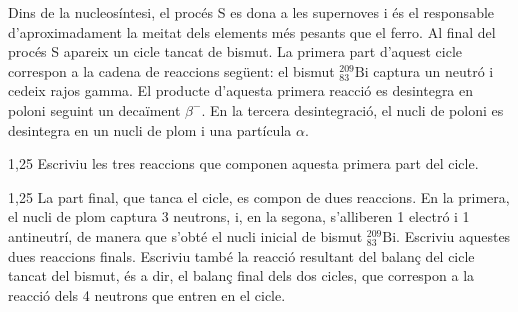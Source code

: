 Dins de la nucleosíntesi, el procés S es dona a les supernoves i és el responsable d'aproximadament la meitat dels elements més pesants que el ferro. Al final del procés S apareix un cicle tancat de bismut. La primera part d'aquest cicle correspon a la cadena de reaccions següent: el bismut ${}^{209}_{83}\mathrm{Bi}$ captura un neutró i cedeix rajos gamma. El producte d'aquesta primera reacció es desintegra en poloni seguint un decaïment $\beta^-$. En la tercera desintegració, el nucli de poloni es desintegra en un nucli de plom i una partícula $\alpha$.

\begin{apartat}{1,25}
Escriviu les tres reaccions que componen aquesta primera part del cicle.
\end{apartat}

\begin{apartat}{1,25}
La part final, que tanca el cicle, es compon de dues reaccions. En la primera, el nucli de plom captura 3 neutrons, i, en la segona, s'alliberen 1 electró i 1 antineutrí, de manera que s'obté el nucli inicial de bismut ${}^{209}_{83}\mathrm{Bi}$. Escriviu aquestes dues reaccions finals. Escriviu també la reacció resultant del balanç del cicle tancat del bismut, és a dir, el balanç final dels dos cicles, que correspon a la reacció dels 4 neutrons que entren en el cicle.
\end{apartat}
